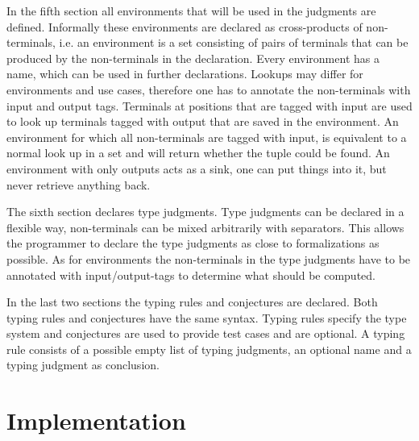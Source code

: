 In the fifth section all environments that will be used in the
judgments are defined. Informally these environments are declared as
cross-products of non-terminals, i.e. an environment is a set
consisting of pairs of terminals that can be produced by the
non-terminals in the declaration. Every environment has a name, which
can be used in further declarations. Lookups may differ for
environments and use cases, therefore one has to annotate the
non-terminals with input and output tags. Terminals at positions that
are tagged with input are used to look up terminals tagged with output
that are saved in the environment. An environment for which all
non-terminals are tagged with input, is equivalent to a normal look up
in a set and will return whether the tuple could be found. An
environment with only outputs acts as a sink, one can put things into
it, but never retrieve anything back.

The sixth section declares type judgments. Type judgments can be
declared in a flexible way, non-terminals can be mixed arbitrarily
with separators. This allows the programmer to declare the type judgments as close to formalizations as
possible. As for environments the non-terminals in the type judgments
have to be annotated with input/output-tags to determine what should
be computed.

In the last two sections the typing rules and conjectures are
declared. Both typing rules and conjectures have the same
syntax. Typing rules specify the type system and conjectures are used
to provide test cases and are optional. A typing rule consists of a possible empty list
of typing judgments, an optional name and a typing judgment as
conclusion.
\section{Implementation}

